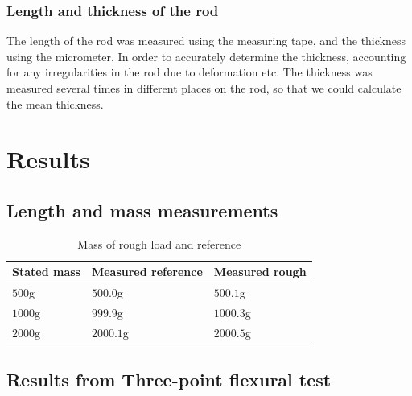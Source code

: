 \documentclass[11pt,a4paper]{article}
\begin{document}
        \subsubsection{Length and thickness of the rod}
          The length of the rod was measured using the measuring tape, and the thickness using the micrometer. In order to accurately determine the thickness, accounting for any irregularities in the rod due to deformation etc. The thickness was measured several times in different places on the rod, so that we could calculate the mean thickness.



\section{\label{sect:results}Results}
  
  \subsection{Length and mass measurements}
    
    \begin{table}[H]
      \center
      \caption{Mass of rough load and reference}
      \begin{tabular}{ | l | l | l |}
        \hline
        Stated mass   & Measured reference   & Measured rough \\ \hline
        $500$g        & $500.0$g             & $500.1$g   \\ \hline
        $1000$g       & $999.9$g             & $1000.3$g  \\ \hline
        $2000$g       & $2000.1$g            & $2000.5$g
        \\ \hline
      \end{tabular}
      \label{tab:masses}
    \end{table}

  \subsection{Results from Three-point flexural test}
\end{document}
